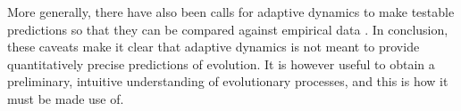 More generally, there have also been calls for adaptive dynamics to make testable predictions so that they can be compared against empirical data \citep{waxman_20_2005}. 
In conclusion, these caveats make it clear that adaptive dynamics is not meant to provide quantitatively precise predictions of evolution.
It is however useful to obtain a preliminary, intuitive understanding of evolutionary processes, and this is how it must be made use of.